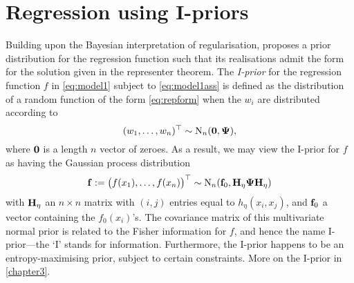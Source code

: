 \documentclass[a4paper,showframe,11pt]{report}
\begin{document}
\section{Regression using I-priors}
\label{sec:introregiprior}

Building upon the Bayesian interpretation of regularisation, \citet{bergsma2017} proposes a prior distribution for the regression function such that its realisations admit the form for the solution given in the representer theorem.
The \emph{I-prior} for the regression function $f$ in \cref{eq:model1} subject to \cref{eq:model1ass} is defined as the distribution of a random function of the form \cref{eq:repform} when the $w_i$ are distributed according to 
%
\[
  (w_1,\dots,w_n)^\top \sim \operatorname{N}_n({\mathbf 0},{\bm\Psi}),
\]
%
where ${\mathbf 0}$ is a length $n$ vector of zeroes.
As a result, we may view the I-prior for $f$ as having the Gaussian process distribution
%
\begin{align}\label{eq:iprior}
  {\mathbf f} := \big(f(x_1),\dots,f(x_n) \big)^\top \sim \operatorname{N}_n({\mathbf f}_0, {\mathbf H}_\eta{\bm\Psi}{\mathbf H}_\eta)
\end{align}
%
with ${\mathbf H}_{\eta}$ an $n \times n$ matrix with $(i,j)$ entries equal to $h_\eta(x_i,x_j)$, and ${\mathbf f}_0$ a vector containing the $f_0(x_i)$'s.
The covariance matrix of this multivariate normal prior is related to the Fisher information for $f$, and hence the name I-prior---the `I' stands for information.
Furthermore, the I-prior happens to be an entropy-maximising prior, subject to certain constraints.
More on the I-prior in \cref{chapter3}.

\end{document}
